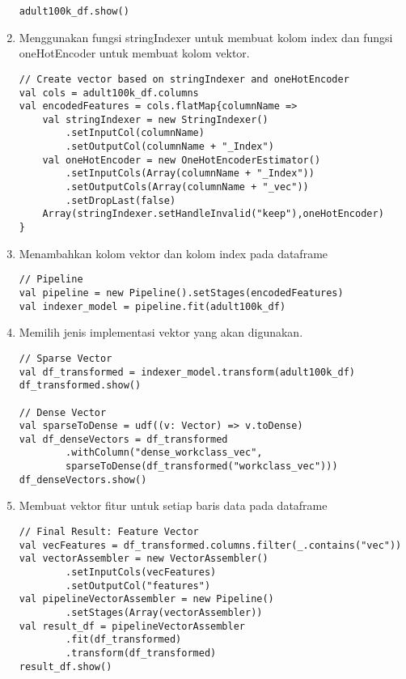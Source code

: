 \begin{enumerate}
\begin{lstlisting}[basicstyle=\ttfamily, frame=single,
	columns=fullflexible, keepspaces=true, breaklines=true, label=ls_kepatuhan_1_1_1_logo_sharif_judge, caption=Main method]
adult100k_df.show()	
\end{lstlisting}

\item Menggunakan fungsi stringIndexer untuk membuat kolom index dan fungsi oneHotEncoder untuk membuat kolom vektor.
\begin{lstlisting}[basicstyle=\ttfamily, frame=single,
	columns=fullflexible, keepspaces=true, breaklines=true, label=ls_kepatuhan_1_1_1_logo_sharif_judge, caption=Main method]
// Create vector based on stringIndexer and oneHotEncoder
val cols = adult100k_df.columns
val encodedFeatures = cols.flatMap{columnName =>
	val stringIndexer = new StringIndexer()
		.setInputCol(columnName)
		.setOutputCol(columnName + "_Index")
	val oneHotEncoder = new OneHotEncoderEstimator()
		.setInputCols(Array(columnName + "_Index"))
		.setOutputCols(Array(columnName + "_vec"))
		.setDropLast(false)
	Array(stringIndexer.setHandleInvalid("keep"),oneHotEncoder)
}	
\end{lstlisting}

\item Menambahkan kolom vektor dan kolom index pada dataframe
\begin{lstlisting}[basicstyle=\ttfamily, frame=single,
	columns=fullflexible, keepspaces=true, breaklines=true, label=ls_kepatuhan_1_1_1_logo_sharif_judge, caption=Main method]
// Pipeline
val pipeline = new Pipeline().setStages(encodedFeatures)
val indexer_model = pipeline.fit(adult100k_df)
\end{lstlisting}

\item Memilih jenis implementasi vektor yang akan digunakan.
\begin{lstlisting}[basicstyle=\ttfamily, frame=single,
	columns=fullflexible, keepspaces=true, breaklines=true, label=ls_kepatuhan_1_1_1_logo_sharif_judge, caption=Main method]
// Sparse Vector
val df_transformed = indexer_model.transform(adult100k_df)
df_transformed.show()

// Dense Vector
val sparseToDense = udf((v: Vector) => v.toDense)
val df_denseVectors = df_transformed
		.withColumn("dense_workclass_vec",
		sparseToDense(df_transformed("workclass_vec")))
df_denseVectors.show()	
\end{lstlisting}

\newpage
\item Membuat vektor fitur untuk setiap baris data pada dataframe
\begin{lstlisting}[basicstyle=\ttfamily, frame=single,
	columns=fullflexible, keepspaces=true, breaklines=true, label=ls_kepatuhan_1_1_1_logo_sharif_judge, caption=Main method]
// Final Result: Feature Vector
val vecFeatures = df_transformed.columns.filter(_.contains("vec"))
val vectorAssembler = new VectorAssembler()
		.setInputCols(vecFeatures)
		.setOutputCol("features")
val pipelineVectorAssembler = new Pipeline()
		.setStages(Array(vectorAssembler))
val result_df = pipelineVectorAssembler
		.fit(df_transformed)
		.transform(df_transformed)
result_df.show()
\end{lstlisting}


\end{enumerate}

